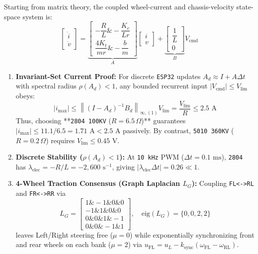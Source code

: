 \documentclass[11pt,a4paper]{article}
\begin{document}
Starting from matrix theory, the coupled wheel-current and chassis-velocity state-space system is:
\[
\begin{bmatrix} \dot{i} \\ \dot{v} \end{bmatrix}
=
\underbrace{\begin{bmatrix} -\dfrac{R}{L} \& -\dfrac{K_e}{L r} \\[6pt] \dfrac{4 K_t}{m r} \& -\dfrac{b}{m} \end{bmatrix}}_{A}
\begin{bmatrix} i \\ v \end{bmatrix}
+
\underbrace{\begin{bmatrix} \dfrac{1}{L} \\ 0 \end{bmatrix}}_{B} V_{\text{cmd}}
\]

\begin{enumerate}
  \item \textbf{Invariant-Set Current Proof:} For discrete \texttt{ESP32} updates $A_d \approx I + A \Delta t$ with spectral radius $\rho(A_d) < 1$, any bounded recurrent input $|V_{\text{cmd}}| \le V_{\text{lim}}$ obeys:
  \[
  |i_{\max}| \le \left\|(I - A_d)^{-1} B_d\right\|_{\infty,(1)} V_{\text{lim}} = \frac{V_{\text{lim}}}{R} \le 2.5\text{ A}
  \]
  Thus, choosing **\texttt{2804 100KV} ($R = 6.5\,\Omega$)** guarantees $|i_{\max}| \le 11.1 / 6.5 = 1.71\text{ A} < 2.5\text{ A}$ passively. By contrast, \texttt{5010 360KV} ($R = 0.2\,\Omega$) requires $V_{\text{lim}} \le 0.45\text{ V}$.
  \item \textbf{Discrete Stability ($\rho(A_d) < 1$):} At \texttt{10 kHz} PWM ($\Delta t = 0.1\text{ ms}$), \texttt{2804} has $\lambda_{\text{elec}} = -R/L = -2{,}600\text{ s}^{-1}$, giving $|\lambda_{\text{elec}} \Delta t| = 0.26 \ll 1$.
  \item \textbf{4-Wheel Traction Consensus (Graph Laplacian $L_G$):} Coupling \texttt{FL<->RL} and \texttt{FR<->RR} via
  \[
  L_G = \begin{bmatrix} 1 \& -1 \& 0 \& 0 \\ -1 \& 1 \& 0 \& 0 \\ 0 \& 0 \& 1 \& -1 \\ 0 \& 0 \& -1 \& 1 \end{bmatrix}, \quad \text{eig}(L_G) = \{0, 0, 2, 2\}
  \]
  leaves Left/Right steering free ($\mu = 0$) while exponentially synchronizing front and rear wheels on each bank ($\mu = 2$) via $u_{\text{FL}} = u_L - k_{\text{sync}}(\omega_{\text{FL}} - \omega_{\text{RL}})$.
\end{enumerate}
\end{document}
